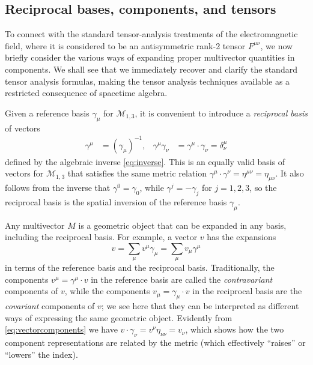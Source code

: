 \documentclass[1p,sort&compress]{elsarticle}
\numberwithin{equation}{section}
\begin{document}
\subsection{Reciprocal bases, components, and tensors}\label{sec:components}


To connect with the standard tensor-analysis treatments of the electromagnetic field, where it is considered to be an antisymmetric rank-2 tensor $F^{\mu\nu}$, we now briefly consider the various ways of expanding proper multivector quantities in components.  We shall see that we immediately recover and clarify the standard tensor analysis formulas, making the tensor analysis techniques available as a restricted consequence of spacetime algebra.

Given a reference basis $\gamma_\mu$ for $\mathcal{M}_{1,3}$, it is convenient to introduce a \emph{reciprocal basis} of vectors 
\begin{align}
  \gamma^\mu &= (\gamma_\mu)^{-1}, &  
  \gamma^\mu\gamma_\nu &= \gamma^\mu \cdot \gamma_\nu = \delta^\mu_\nu
\end{align}
defined by the algebraic inverse \eqref{eq:inverse}.  This is an equally valid basis of vectors for $\mathcal{M}_{1,3}$ that satisfies the same metric relation $\gamma^\mu \cdot \gamma^\nu = \eta^{\mu\nu} = \eta_{\mu\nu}$.  It also follows from the inverse that $\gamma^0 = \gamma_0$, while $\gamma^j = -\gamma_j$ for $j = 1,2,3$, so the reciprocal basis is the spatial inversion of the reference basis $\gamma_\mu$.

Any multivector $M$ is a geometric object that can be expanded in any basis, including the reciprocal basis.  For example, a vector $v$ has the expansions
\begin{equation}\label{eq:vectorcomponents}
  v = \sum_\mu v^\mu \gamma_\mu = \sum_\mu v_\mu \gamma^\mu
\end{equation}
in terms of the reference basis and the reciprocal basis.  Traditionally, the components $v^\mu = \gamma^\mu \cdot v$ in the reference basis are called the \emph{contravariant} components of $v$, while the components $v_\mu = \gamma_\mu \cdot v$ in the reciprocal basis are the \emph{covariant} components of $v$; we see here that they can be interpreted as different ways of expressing the same geometric object.  Evidently from \eqref{eq:vectorcomponents} we have $v \cdot \gamma_\nu = v^\nu \eta_{\nu \nu} = v_\nu$, which shows how the two component representations are related by the metric (which effectively ``raises'' or ``lowers'' the index).
\end{document}
